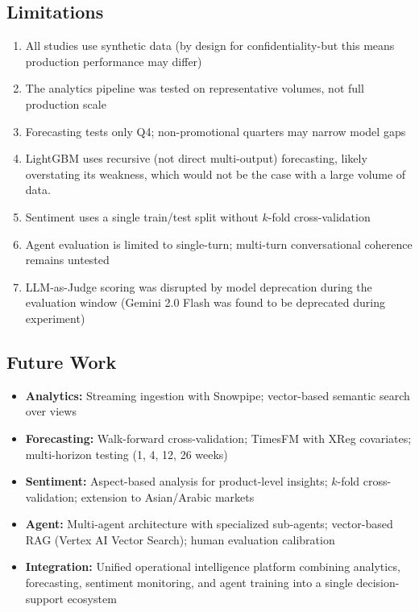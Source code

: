 \documentclass[11pt,a4paper]{article}
\begin{document}
\subsection{Limitations}

\begin{enumerate}[leftmargin=*,noitemsep,topsep=2pt]
    \item All studies use synthetic data (by design for confidentiality-but this means production performance may differ)
    \item The analytics pipeline was tested on representative volumes, not full production scale
    \item Forecasting tests only Q4; non-promotional quarters may narrow model gaps
    \item LightGBM uses recursive (not direct multi-output) forecasting, likely overstating its weakness, which would not be the case with a large volume of data.
    \item Sentiment uses a single train/test split without $k$-fold cross-validation
    \item Agent evaluation is limited to single-turn; multi-turn conversational coherence remains untested
    \item LLM-as-Judge scoring was disrupted by model deprecation during the evaluation window (Gemini 2.0 Flash was found to be deprecated during experiment)
\end{enumerate}

\subsection{Future Work}
\begin{itemize}[leftmargin=*,noitemsep,topsep=2pt]
    \item \textbf{Analytics:} Streaming ingestion with Snowpipe; vector-based semantic search over views
    \item \textbf{Forecasting:} Walk-forward cross-validation; TimesFM with XReg covariates; multi-horizon testing (1, 4, 12, 26 weeks)
    \item \textbf{Sentiment:} Aspect-based analysis for product-level insights; $k$-fold cross-validation; extension to Asian/Arabic markets
    \item \textbf{Agent:} Multi-agent architecture with specialized sub-agents; vector-based RAG (Vertex AI Vector Search); human evaluation calibration
    \item \textbf{Integration:} Unified operational intelligence platform combining analytics, forecasting, sentiment monitoring, and agent training into a single decision-support ecosystem
\end{itemize}
\end{document}
